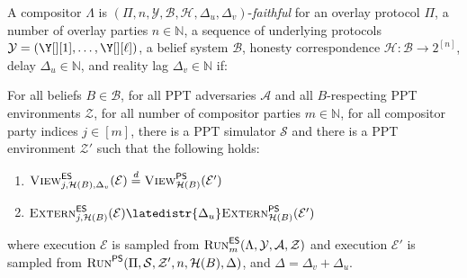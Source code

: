 \begin{definition}
  A compositor $\Lambda$
  is $(\Pi, n, \mathcal{Y}, \mathcal{B}, \mathcal{H}, \Delta_u, \Delta_v)$-\emph{faithful}
  for an overlay protocol $\Pi$,
  a number of overlay parties $n \in \mathbb{N}$,
  a sequence of underlying protocols $\mathcal{Y} = (\Y[][1], \ldots, \Y[][\ell])$,
  a belief system $\mathcal{B}$,
  honesty correspondence $\mathcal{H}: \mathcal{B} \longrightarrow 2^{[n]}$,
  delay $\Delta_u \in \mathbb{N}$,
  and reality lag $\Delta_v \in \mathbb{N}$
  if:

  For all beliefs $B \in \mathcal{B}$,
  for all PPT adversaries $\mathcal{A}$ and all
  $B$-respecting PPT environments $\mathcal{Z}$,
  for all number of compositor parties $m \in \mathbb{N}$,
  for all compositor party indices $j \in [m]$,
  there is a PPT simulator $\mathcal{S}$ and there is a
  PPT environment $\mathcal{Z}'$ such that
  the following holds:

  \begin{enumerate}
    \item $\LCView_{j,\mathcal{H}(B),\Delta_v}(\mathcal{E}) \distreq \PEView_{\mathcal{H}(B)}(\mathcal{E}')$
    \item $\LCExtern_{j,\mathcal{H}(B)}(\mathcal{E}) \latedistr{\Delta_u} \PEExtern_{\mathcal{H}(B)}(\mathcal{E}')$
  \end{enumerate}

  where execution $\mathcal{E}$ is sampled from
  $\textsc{Run}^{\textsf{ES}}_m(\Lambda, \mathcal{Y}, \mathcal{A}, \mathcal{Z})$
  and execution $\mathcal{E}'$ is sampled from
  $\textsc{Run}^{\textsf{PS}}(\Pi, \mathcal{S}, \mathcal{Z}', n, \mathcal{H}(B), \Delta)$,
  and $\Delta = \Delta_v + \Delta_u$.
\end{definition}


